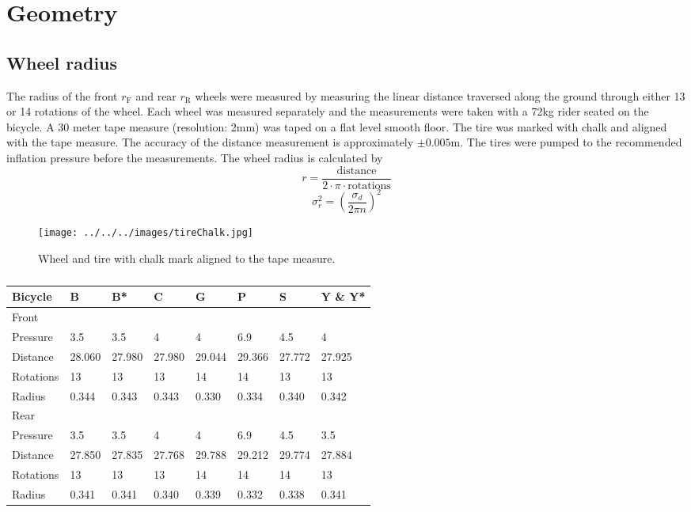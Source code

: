 \documentclass{bmd2010p}
\begin{document}
\section{Geometry}

\subsection{Wheel radius}
The radius of the front $r_\mathrm{F}$ and rear $r_\mathrm{R}$ wheels were
measured by measuring the linear distance traversed along the ground through
either 13 or 14 rotations of the wheel. Each wheel was measured separately and
the measurements were taken with a 72kg rider seated on the bicycle. A 30 meter
tape measure (resolution: 2mm) was taped on a flat level smooth floor. The tire
was marked with chalk and aligned with the tape measure. The accuracy of the
distance measurement is approximately $\pm0.005$m. The tires were pumped to the
recommended inflation pressure before the measurements. The wheel radius is
calculated by
\begin{equation}
	r=\frac{\textrm{distance}}{2\cdot\pi\cdot\textrm{rotations}}
	\label{eq:wheelRadius}
\end{equation}
\begin{equation}
    \sigma_r^{2}=\left(\frac{\sigma_d}{2\pi n}\right)^{2}
    \label{eq:WheelRadVar}
\end{equation}
\begin{figure}[tb]
	\begin{center}
		\texttt{[image: ../../../images/tireChalk.jpg]}
	\end{center}
	\caption{Wheel and tire with chalk mark aligned to the tape measure.}
	\label{fig:tireChalk}
\end{figure}
\begin{table}
	\begin{tabular}{llllllll}
	Bicycle   & B      & B*     & C      & G      & P      & S      & Y \& Y*\\
    \hline
	Front\\
	Pressure  & 3.5    & 3.5    & 4      & 4      & 6.9    & 4.5    & 4      \\
	Distance  & 28.060 & 27.980 & 27.980 & 29.044 & 29.366 & 27.772 & 27.925 \\
	Rotations & 13     & 13     & 13     & 14     & 14     & 13     & 13     \\
	Radius    & 0.344  & 0.343  & 0.343  & 0.330  & 0.334  & 0.340  & 0.342  \\
	Rear\\
	Pressure  & 3.5    & 3.5    & 4      & 4      & 6.9    & 4.5    & 3.5    \\
	Distance  & 27.850 & 27.835 & 27.768 & 29.788 & 29.212 & 29.774 & 27.884 \\
	Rotations & 13     & 13     & 13     & 14     & 14     & 14     & 13     \\
	Radius    & 0.341  & 0.341  & 0.340  & 0.339  & 0.332  & 0.338  & 0.341
	\end{tabular}
	\caption{}
	\label{tab:wheelRadius}
\end{table}
\end{document}

